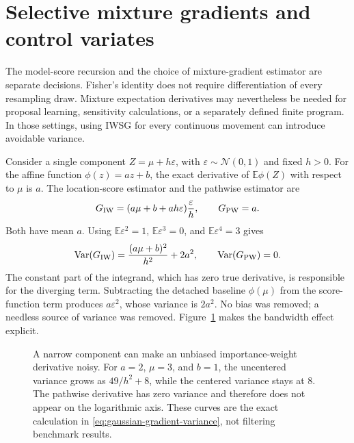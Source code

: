 \section{Selective mixture gradients and control variates}
\label{sec:hybrid}

The model-score recursion and the choice of mixture-gradient estimator are
separate decisions. Fisher's identity does not require differentiation of
every resampling draw. Mixture expectation derivatives may nevertheless be
needed for proposal learning, sensitivity calculations, or a separately
defined finite program. In those settings, using IWSG for every continuous
movement can introduce avoidable variance.

Consider a single component $Z=\mu+h\varepsilon$, with
$\varepsilon\sim\mathcal N(0,1)$ and fixed $h>0$. For the affine function
$\phi(z)=az+b$, the exact derivative of $\mathbb E\phi(Z)$ with respect to
$\mu$ is $a$. The location-score estimator and the pathwise estimator are
\begin{equation}
 G_{\rm IW}=(a\mu+b+ah\varepsilon)\frac{\varepsilon}{h},
 \qquad G_{\rm PW}=a.
 \label{eq:gaussian-gradient-estimators}
\end{equation}
Both have mean $a$. Using
$\mathbb E\varepsilon^2=1$, $\mathbb E\varepsilon^3=0$, and
$\mathbb E\varepsilon^4=3$ gives
\begin{equation}
 \operatorname{Var}(G_{\rm IW})
   =\frac{(a\mu+b)^2}{h^2}+2a^2,
 \qquad \operatorname{Var}(G_{\rm PW})=0.
 \label{eq:gaussian-gradient-variance}
\end{equation}
The constant part of the integrand, which has zero true derivative, is
responsible for the diverging term. Subtracting the detached baseline
$\phi(\mu)$ from the score-function term produces $a\varepsilon^2$, whose
variance is $2a^2$. No bias was removed; a needless source of variance was
removed. Figure~\ref{fig:gradient-variance} makes the bandwidth effect explicit.

\begin{figure}[tbp]
\centering
{}
\caption{A narrow component can make an unbiased importance-weight derivative
noisy. For $a=2$, $\mu=3$, and $b=1$, the uncentered variance grows as
$49/h^2+8$, while the centered variance stays at 8. The pathwise derivative
has zero variance and therefore does not appear on the logarithmic axis.
These curves are the exact calculation in
\eqref{eq:gaussian-gradient-variance}, not filtering benchmark results.}
\label{fig:gradient-variance}
\end{figure}

